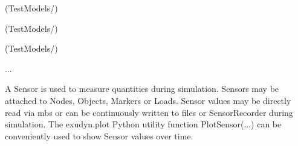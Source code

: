 \item {} (TestModels/)
\item {} (TestModels/)
\item {} (TestModels/)
\item  ...


\ei

%

\newpage
A Sensor is used to measure quantities during simulation. Sensors may be attached to Nodes, Objects, Markers or Loads. Sensor values may be directly read via mbs or can be continuously written to files or SensorRecorder during simulation. The exudyn.plot Python utility function PlotSensor(...) can be conveniently used to show Sensor values over time.


